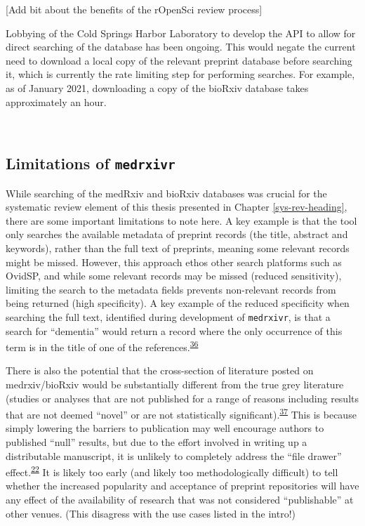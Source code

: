 \documentclass[a4paper, twoside]{templates/ociamthesis}
\begin{document}
{[}Add bit about the benefits of the rOpenSci review process{]}

Lobbying of the Cold Springs Harbor Laboratory to develop the API to allow for direct searching of the database has been ongoing. This would negate the current need to download a local copy of the relevant preprint database before searching it, which is currently the rate limiting step for performing searches. For example, as of January 2021, downloading a copy of the bioRxiv database takes approximately an hour.

~

\hypertarget{limitations-of-medrxivr}{%
\subsection{\texorpdfstring{Limitations of \texttt{medrxivr}}{Limitations of medrxivr}}\label{limitations-of-medrxivr}}

While searching of the medRxiv and bioRxiv databases was crucial for the systematic review element of this thesis presented in Chapter \ref{sys-rev-heading}, there are some important limitations to note here. A key example is that the tool only searches the available metadata of preprint records (the title, abstract and keywords), rather than the full text of preprints, meaning some relevant records might be missed. However, this approach ethos other search platforms such as OvidSP, and while some relevant records may be missed (reduced sensitivity), limiting the search to the metadata fields prevents non-relevant records from being returned (high specificity). A key example of the reduced specificity when searching the full text, identified during development of \texttt{medrxivr}, is that a search for ``dementia'' would return a record where the only occurrence of this term is in the title of one of the references.\textsuperscript{\protect\hyperlink{ref-bong2019}{36}}

There is also the potential that the cross-section of literature posted on medrxiv/bioRxiv would be substantially different from the true grey literature (studies or analyses that are not published for a range of reasons including results that are not deemed ``novel'' or are not statistically significant).\textsuperscript{\protect\hyperlink{ref-song2010}{37}} This is because simply lowering the barriers to publication may well encourage authors to published ``null'' results, but due to the effort involved in writing up a distributable manuscript, it is unlikely to completely address the ``file drawer'' effect.\textsuperscript{\protect\hyperlink{ref-rosenthal1979}{22}} It is likely too early (and likely too methodologically difficult) to tell whether the increased popularity and acceptance of preprint repositories will have any effect of the availability of research that was not considered ``publishable'' at other venues. (This disagress with the use cases listed in the intro!)
\end{document}

